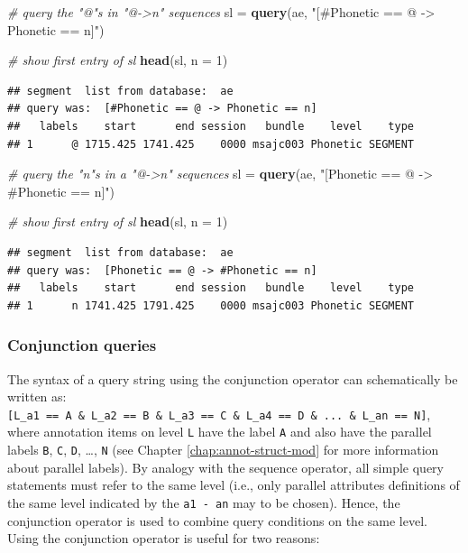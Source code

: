 \documentclass[]{book}
\newenvironment{Shaded}{\begin{snugshade}}{\end{snugshade}}
\newcommand{\CommentTok}[1]{\textcolor[rgb]{0.56,0.35,0.01}{\textit{#1}}}
\newcommand{\DataTypeTok}[1]{\textcolor[rgb]{0.13,0.29,0.53}{#1}}
\newcommand{\DecValTok}[1]{\textcolor[rgb]{0.00,0.00,0.81}{#1}}
\newcommand{\KeywordTok}[1]{\textcolor[rgb]{0.13,0.29,0.53}{\textbf{#1}}}
\newcommand{\NormalTok}[1]{#1}
\newcommand{\StringTok}[1]{\textcolor[rgb]{0.31,0.60,0.02}{#1}}
\theoremstyle{definition}
\theoremstyle{definition}
\theoremstyle{definition}
\theoremstyle{remark}
\begin{document}
\begin{Shaded}
\begin{Highlighting}[]
\CommentTok{# query the "@"s in "@->n" sequences}
\NormalTok{sl =}\StringTok{ }\KeywordTok{query}\NormalTok{(ae, }\StringTok{"[#Phonetic == @ -> Phonetic == n]"}\NormalTok{)}

\CommentTok{# show first entry of sl}
\KeywordTok{head}\NormalTok{(sl, }\DataTypeTok{n =} \DecValTok{1}\NormalTok{)}
\end{Highlighting}
\end{Shaded}

\begin{verbatim}
## segment  list from database:  ae 
## query was:  [#Phonetic == @ -> Phonetic == n] 
##   labels    start      end session   bundle    level    type
## 1      @ 1715.425 1741.425    0000 msajc003 Phonetic SEGMENT
\end{verbatim}

\begin{Shaded}
\begin{Highlighting}[]
\CommentTok{# query the "n"s in a "@->n" sequences}
\NormalTok{sl =}\StringTok{ }\KeywordTok{query}\NormalTok{(ae, }\StringTok{"[Phonetic == @ -> #Phonetic == n]"}\NormalTok{)}

\CommentTok{# show first entry of sl}
\KeywordTok{head}\NormalTok{(sl, }\DataTypeTok{n =} \DecValTok{1}\NormalTok{)}
\end{Highlighting}
\end{Shaded}

\begin{verbatim}
## segment  list from database:  ae 
## query was:  [Phonetic == @ -> #Phonetic == n] 
##   labels    start      end session   bundle    level    type
## 1      n 1741.425 1791.425    0000 msajc003 Phonetic SEGMENT
\end{verbatim}

\hypertarget{conjunction-queries}{%
\subsubsection{Conjunction queries}\label{conjunction-queries}}

The syntax of a query string using the conjunction operator can
schematically be written as:
\texttt{{[}L\_a1\ ==\ A\ \&\ L\_a2\ ==\ B\ \&\ L\_a3\ ==\ C\ \&\ L\_a4\ ==\ D\ \&\ ...\ \&\ L\_an\ ==\ N{]}},
where annotation items on level \texttt{L} have the label \texttt{A} and
also have the parallel labels \texttt{B}, \texttt{C}, \texttt{D},
\ldots{}, \texttt{N} (see Chapter \ref{chap:annot-struct-mod} for more
information about parallel labels). By analogy with the sequence
operator, all simple query statements must refer to the same level
(i.e., only parallel attributes definitions of the same level indicated
by the \texttt{a1\ -\ an} may to be chosen). Hence, the conjunction
operator is used to combine query conditions on the same level. Using
the conjunction operator is useful for two reasons:
\end{document}

